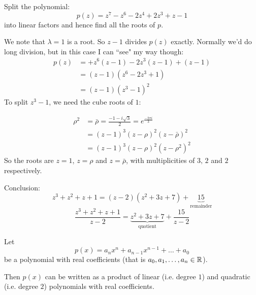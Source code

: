 \documentclass[10pt]{scrartcl}
\begin{document}
\begin{example}
Split the polynomial: 
\[p(z) = z^7 - z^6 - 2z^4 + 2z^3 + z -1\]	
into linear factors and hence find all the roots of $p$. 

We note that $\lambda = 1$ is a root. So $z -1$ divides $p(z)$ exactly. Normally we'd do long division, but in this case I can ``see" my way though: 
\[
\begin{aligned}
  p(z)&= +z^6(z-1) - 2z^3(z-1) + (z-1)\\
  &= (z-1)(z^6 -2z^3 + 1)\\
  &= (z-1)(z^3-1)^2
\end{aligned}
\]
To split $z^3 -1$, we need the cube roots of $1$: 

\begin{center}
\end{center}
\[
\begin{aligned}
  \rho^2 &= \bar{\rho} = \frac{-1-i\sqrt{3}}{2} = e^{\frac{-2\pi i}{3}}\\
  &= (z-1)^3(z-\rho)^2(z-\bar{\rho})^2\\
  &= (z-1)^3(z-\rho)^2(z-\rho^2)^2
\end{aligned}
\]
So the roots are $z = 1$, $z = \rho$ and $z = \bar{\rho}$, with multiplicities of $3,\,2$ and $2$ respectively. 
\end{example}\vspace*{5pt}

\begin{example}
\vspace*{5pt}

	
Conclusion: 
\[z^3 + z^2 +  z + 1 = (z-2)(z^2 + 3z + 7) + \underbrace{15}_{\text{remainder}}\]
\[\frac{z^3 + z^2 + z + 1}{z-2} = \underbrace{z^2 + 3z + 7}_{\text{quotient}} + \frac{15}{z-2}\]
\end{example}\vsp

\begin{corollary}
Let 
\[p(x) = a_nx^n + a_{n-1}x^{n-1} + \dots + a_0\]
be a polynomial with real coefficients (that is $a_0,a_1,\dots,a_n \in\mathbb{R}$). 

Then $p(x)$ can be written as a product of linear (i.e. degree $1$) and quadratic (i.e. degree $2$) polynomials with real coefficients. 
\end{corollary}
\end{document}
